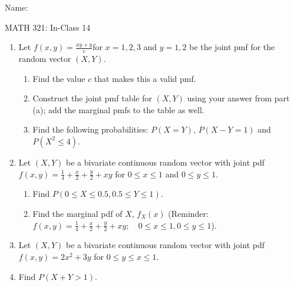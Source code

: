 \documentclass{article}
\begin{document}
\hspace{375pt}Name:

\begin{center}
{\Huge MATH 321: In-Class 14}
\end{center}

\bigskip\bigskip


\begin{enumerate}
    \item Let $\displaystyle f(x,y) = \frac{xy + y}{c}$\quad for $x = 1, 2, 3$ and $y = 1, 2$ be the joint pmf for the random vector $(X,Y)$.%
    \begin{enumerate}
        \item Find the value $c$ that makes this a valid pmf.\vspace{100pt}%
        \item Construct the joint pmf table for $(X,Y)$ using your answer from part (a); add the marginal pmfs to the table as well.\vspace{100pt}
        \item Find the following probabilities: $P(X = Y)$, $P(X - Y = 1)$ and $P(X^2 \le 4)$.\vspace{50pt}%
    \end{enumerate}\bigskip
    
    \item Let $(X,Y)$ be a bivariate continuous random vector with joint pdf \\ $\displaystyle f(x,y) = \frac{1}{4} + \frac{x}{2} + \frac{y}{2} + xy$ \quad for $0 \le x \le 1$ and $0 \le y \le 1$.
    \begin{enumerate}
        \item Find $P(0 \le X \le 0.5, 0.5 \le Y \le 1)$.\vspace{175pt}%
        \item Find the marginal pdf of $X$, $f_X(x)$ \quad (Reminder: $\displaystyle f(x,y) = \frac{1}{4} + \frac{x}{2} + \frac{y}{2} + xy; \quad 0 \le x \le 1, 0 \le y \le 1$).\vspace{175pt}%
    \end{enumerate}\bigskip
    
    \item Let $(X,Y)$ be a bivariate continuous random vector with joint pdf \\$\displaystyle f(x,y) = 2x^2 + 3y $ \quad for $0 \le y \le x \le 1$.%
    \item[] Find $P(X + Y > 1)$.%
\end{enumerate}
\end{document}
